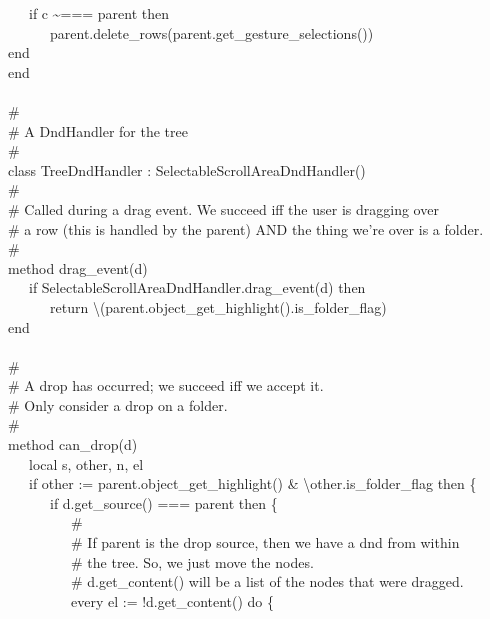{\>   \ \ \ if c \~{}=== parent then \\
\>   \ \ \ \ \ \ parent.delete\_rows(parent.get\_gesture\_selections()) \\
\>   end \\
end \\
\ \\
\# \\
\# A DndHandler for the tree \\
\# \\
class TreeDndHandler : SelectableScrollAreaDndHandler() \\
\>   \# \\
\>   \# Called during a drag event. We succeed iff the user is dragging over \\
\>   \# a row (this is handled by the parent) AND the thing we're over is a folder. \\
\>   \# \\
\>   method drag\_event(d) \\
\>   \ \ \ if SelectableScrollAreaDndHandler.drag\_event(d) then \\
\>   \ \ \ \ \ \ return
{\textbackslash}(parent.object\_get\_highlight().is\_folder\_flag) \\
\>   end \\
\ \\
\>   \# \\
\>   \# A drop has occurred; we succeed iff we accept it. \\
\>   \# Only consider a drop on a folder. \\
\>   \# \\
\>   method can\_drop(d) \\
\>   \ \ \ local s, other, n, el \\
\>   \ \ \ if other := parent.object\_get\_highlight() \&
{\textbackslash}other.is\_folder\_flag then \{ \\
\>   \ \ \ \ \ \ if d.get\_source() === parent then \{ \\
\>   \ \ \ \ \ \ \ \ \ \# \\
\>   \ \ \ \ \ \ \ \ \ \# If parent is the drop source, then we have a dnd
                          from within \\
\>   \ \ \ \ \ \ \ \ \ \# the tree. So, we just move the nodes. \\
\>   \ \ \ \ \ \ \ \ \ \# d.get\_content() will be a list of the nodes
that were dragged. \\
\>   \ \ \ \ \ \ \ \ \ every el := !d.get\_content() do \{ \\
}
